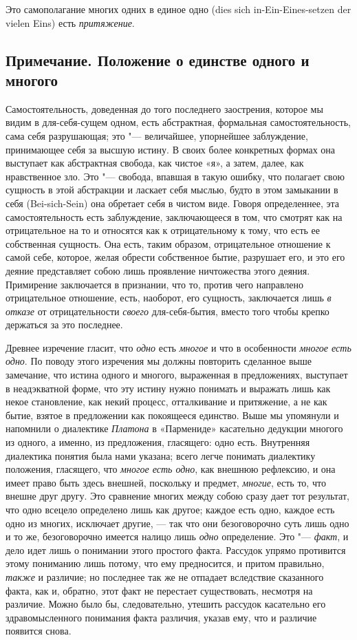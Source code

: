 Это самополагание многих одних в единое одно
(dies sich in-Ein-Eines-setzen der vielen Eins)
есть {\em притяжение}.

\subsection*{Примечание. Положение о единстве одного и многого}

Самостоятельность, доведенная до того последнего заострения, которое мы
видим в для-себя-сущем одном, есть абстрактная, формальная
самостоятельность, сама себя разрушающая; это "--- величайшее, упорнейшее
заблуждение, принимающее себя за высшую истину. В своих более конкретных
формах она выступает как абстрактная свобода, как чистое «я», а затем,
далее, как нравственное зло. Это "--- свобода, впавшая в такую ошибку, что
полагает свою сущность в этой абстракции и ласкает себя мыслью, будто в
этом замыкании в себя (Bei-sich-Sein) она обретает себя в чистом виде.
Говоря определеннее, эта самостоятельность есть заблуждение, заключающееся
в том, что смотрят как на отрицательное на то и относятся как к
отрицательному к тому, что есть ее собственная сущность. Она есть, таким
образом, отрицательное отношение к самой себе, которое, желая обрести
собственное бытие, разрушает его, и это его деяние представляет собою лишь
проявление ничтожества этого деяния. Примирение заключается в признании,
что то, против чего направлено отрицательное отношение, есть, наоборот, его
сущность, заключается лишь {\em в отказе} от
отрицательности {\em своего} для-себя-бытия, вместо
того чтобы крепко держаться за это последнее.

Древнее изречение гласит, что {\em одно} есть
{\em многое} и что в особенности
{\em многое есть одно}. По поводу этого изречения мы
должны повторить сделанное выше замечание, что истина одного и многого,
выраженная в предложениях, выступает в неадэкватной форме, что эту истину
нужно понимать и выражать лишь как некое становление, как некий процесс,
отталкивание и притяжение, а не как бытие, взятое в предложении как
покоящееся единство. Выше мы упомянули и напомнили о диалектике
{\em Платона} в «Пармениде» касательно дедукции многого
из одного, а именно, из предложения, гласящего: одно есть. Внутренняя
диалектика понятия была нами указана; всего легче понимать диалектику
положения, гласящего, что {\em многое есть одно}, как
внешнюю рефлексию, и она имеет право быть здесь внешней, поскольку и
предмет, {\em многие}, есть то, что внешне друг другу.
Это сравнение многих между собою сразу дает тот результат, что одно всецело
определено лишь как другое; каждое есть одно, каждое есть одно из многих,
исключает другие, — так что они безоговорочно суть лишь одно и то же,
безоговорочно имеется налицо лишь {\em одно}
определение. Это "--- {\em факт}, и дело идет лишь о
понимании этого простого факта. Рассудок упрямо противится этому пониманию
лишь потому, что ему предносится, и притом правильно,
{\em также} и различие; но последнее так же не отпадает
вследствие сказанного факта, как и, обратно, этот факт не перестает
существовать, несмотря на различие. Можно было бы, следовательно, утешить
рассудок касательно его здравомысленного понимания факта различия, указав
ему, что и различие появится снова.

